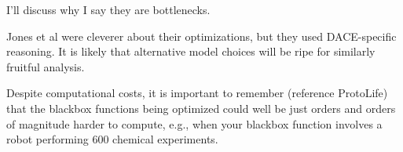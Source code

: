 I'll discuss why I say they are bottlenecks.

Jones et al were cleverer about their optimizations, but they used DACE-specific reasoning. It is likely that alternative model choices will be ripe for similarly fruitful analysis.

Despite computational costs, it is important to remember (reference ProtoLife) that the blackbox functions being optimized could well be just orders and orders of magnitude harder to compute, e.g., when your blackbox function involves a robot performing 600 chemical experiments.

